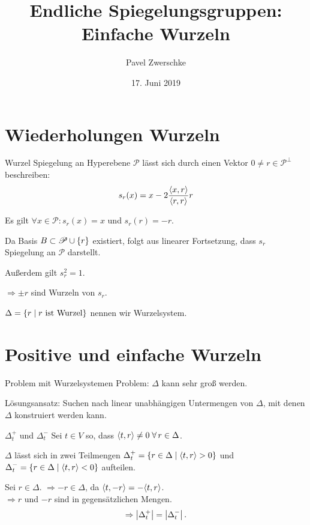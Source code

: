 \documentclass[18pt]{beamer}
\title[Einfache Wurzeln]{Endliche Spiegelungsgruppen:\\
Einfache Wurzeln}
\author{Pavel Zwerschke}
\date{17. Juni 2019}
\begin{document}
\begin{frame}
    \maketitle
\end{frame}

\begin{frame}
    \tableofcontents
\end{frame}

\section{Wiederholungen Wurzeln}

\begin{frame}{Wurzel}
    Spiegelung an Hyperebene \( \mathscr{P} \) 
    lässt sich durch einen Vektor
    \( 0 \neq r \in \mathscr{P}^{\bot} \)
    beschreiben:
    \[ s_r(x) = x 
    - 2\frac{\langle x, r \rangle}{\langle r, r \rangle} r \]
    \pause
    
    Es gilt \( \forall x \in \mathscr{P}: s_r(x) = x \) 
    und \( s_r(r) = -r \). \pause

    Da Basis \( B \subset \mathscr{P} \cup \{r\} \) 
    existiert, folgt aus linearer Fortsetzung, dass 
    \( s_r \) Spiegelung an \( \mathscr{P} \) darstellt.

    \pause
    Außerdem gilt \( s_r^2 = 1 \).

    \( \Rightarrow \pm r \) sind Wurzeln von \( s_r \).

    \( \Delta = \{ r \;\vert\; r \text{ ist Wurzel} \} \) 
    nennen wir Wurzelsystem.
\end{frame}
\section{Positive und einfache Wurzeln}
\begin{frame}{Problem mit Wurzelsystemen}
    Problem: \( \Delta \) kann sehr groß werden. \pause

    Lösungsansatz: Suchen nach linear unabhängigen 
    Untermengen von \( \Delta \), mit denen \( \Delta \)
    konstruiert werden kann.
\end{frame}

\begin{frame}{\( \Delta_t^+ \) und \( \Delta_t^- \)}
    Sei \( t \in V \) so, dass \( \scalarprod{t}{r} \neq 0 
    \; \forall r \in \Delta \).\pause

    \( \Delta \) lässt sich in zwei Teilmengen 
    \( \Delta_t^+ = 
    \{r \in \Delta \;\vert \; \langle t, r \rangle > 0\} \) 
    und \( \Delta_t^- = 
    \{r \in \Delta \;\vert \; \langle t, r \rangle < 0\} \) 
    aufteilen. \pause

    Sei \( r \in \Delta \). \( \Rightarrow -r \in \Delta \), 
    da \( \langle t, -r \rangle = -\langle t, r \rangle \).\\
    \( \Rightarrow r \) und \( -r \) sind in 
    gegensätzlichen Mengen. \pause
    \[ \Rightarrow \left|\Delta_t^+\right| = \left|\Delta_t^-\right|. \]
\end{frame}
\end{document}
